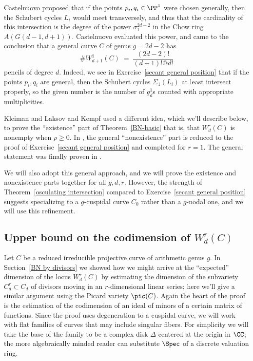 Castelnuovo proposed that if the points $p_i, q_i\in \PP^1$ were chosen
generally, then the Schubert cycles
$L_i$ would meet transversely, and thus that the cardinality of this
intersection is the degree of the power $\sigma_1^{2d-2}$ in the
Chow ring
%
$A(G(d-1, d+1))$. Castelnuovo evaluated this power, and came to
the conclusion that a general curve $C$ of genus $g=2d-2$ has
$$
\#W^1_{d+1}(C) \; = \; \frac{(2d-2)!}{(d-1)!@d!}
$$
pencils of degree $d$. Indeed, we see
 in Exercise~\ref{secant general position} that if the points $p_i, q_i$
 are general, then the Schubert cycles $\Sigma_1(L_i)$ at least intersect
 properly, so the given number is the number of $g^1_d$s counted with
 appropriate multiplicities.

Kleiman and Laksov \citeyear{MR323792,MR0357398} and
Kempf \citeyear{Kempf} used a
%
%
%
different idea, which we'll describe
below, to prove the ``existence'' part of Theorem~\ref{BN-basic}
\emdash that is, that $W^{r}_{d}(C)$ is nonempty when $\rho\geq 0$.
In \cite{Kleiman-special}, the general ``nonexistence'' part is reduced
to the proof of Exercise~\ref{secant general position} and completed
for $r=1$. The general statement was finally proven in
\cite{Griffiths-Harris-BN}.

We will also adopt this general approach, and we will prove the existence
and nonexistence parts together
for all $g,d,r$. However, the strength of Theorem~\ref{osculating
intersection} compared to Exercise~\ref{secant general position} suggests
specializing to a $g$-cuspidal curve $C_0$ rather than a $g$-nodal one,
and we will use
this refinement.

\subsection*{Upper bound on the codimension of $W^r_d(C)$}

Let $C$ be a reduced irreducible projective curve of arithmetic genus
$g$.  In Section~\ref{BN by divisors} we showed how we might arrive
at the ``expected'' dimension of the locus
$W^r_d(C)$
%
by estimating the
dimension of the subvariety $C^r_d \subset C_d$ of divisors moving in
an $r$-dimensional linear series; here we'll give a similar argument
using the
Picard variety
%
$\pic(C)$. Again the heart of the proof is the
estimation of the
codimension of an
ideal of minors
%
of a certain matrix of functions. Since
the proof uses degeneration
to a cuspidal curve, we will work with flat families of curves that may
include singular fibers. For simplicity
we will take the base of the family to be a complex disk $\Delta$
centered at the origin in $\CC$; the more algebraically minded reader
can substitute $\Spec$ of a
discrete valuation ring.

